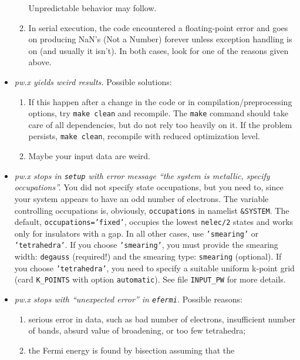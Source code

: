 \documentclass[12pt]{article}
\begin{document}
\begin{itemize}
\begin{enumerate}
      Unpredictable behavior may follow.
      \item
      In serial execution, the code encountered a floating-point
      error and goes on producing NaN's (Not a Number) forever 
      unless exception handling is on (and usually it isn't).
      In both cases, look for one of the reasons given above.
      \end{enumerate}
\item {\em pw.x yields weird results.}
      Possible solutions:
      \begin{enumerate}
      \item
      If this happen after a change in the code or in 
      compilation/preprocessing options, try {\tt make clean}
      and recompile. The {\tt make} command should take care of
      all dependencies, but do not rely too heavily on it. 
      If the problem persists, {\tt make clean}, recompile
      with reduced optimization level.
      \item
      Maybe your input data are weird.
      \end{enumerate}
\item {\em pw.x stops in {\tt setup} with error message
       ``the system is metallic, specify occupations''.}
       You did not specify state occupations, but you need to, since 
       your system appears to have an odd number of electrons. The 
       variable controlling occupations is, obviously, {\tt occupations}
       in namelist {\tt \&SYSTEM}. The default, {\tt occupations='fixed'},
       occupies the lowest {\tt nelec/2} states and works only for 
       insulators with a gap. In all other cases, use {\tt 'smearing'}
       or {\tt 'tetrahedra'}. If you choose {\tt 'smearing'},
       you must provide the smearing width: {\tt degauss} (required!)
       and the smearing type: {\tt smearing} (optional).
       If you choose {\tt 'tetrahedra'}, you need to specify
       a suitable uniform k-point grid (card {\tt K\_POINTS} with
       option {\tt automatic}).
       See file {\tt INPUT\_PW} for more details.
\item {\em pw.x stops with ``unexpected error'' in {\tt efermi}.}
      Possible reasons:
      \begin{enumerate}
      \item
      serious error in data, such as bad number of electrons,
      insufficient number of bands, absurd value of broadening,
      or too few tetrahedra;
      \item
      the Fermi energy is found by bisection assuming that the

\end{enumerate}
\end{itemize}
\end{document}

